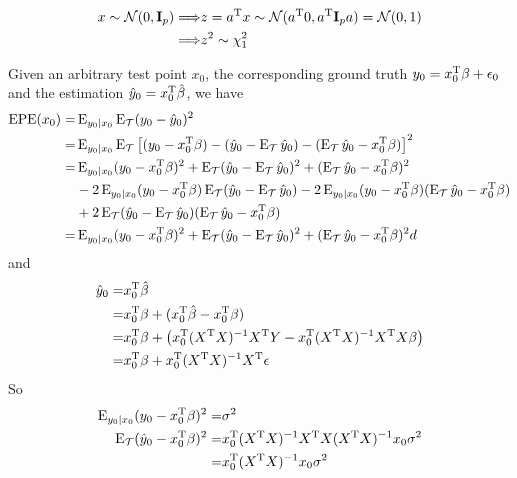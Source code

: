 \begin{sol}
\begin{align*}
x\sim\mathcal{N}(0,\mathbf{I}_p)\Longrightarrow & z=a^{\mathrm{T}}x\sim\mathcal{N}(a^{\mathrm{T}}0,a^{\mathrm{T}}\mathbf{I}_pa)=\mathcal{N}(0,1)\\
\Longrightarrow & z^2\sim \chi_1^2
\end{align*}
\end{sol}

\begin{sol}
Given an arbitrary test point $x_0$, the corresponding ground truth $y_0=x_0^{\mathrm{T}}\beta+\epsilon_0$ and the estimation $\hat{y}_0=x_0^{\mathrm{T}}\hat{\beta}$, we have
\begin{align*}
\mathrm{EPE}(x_0) = & \operatorname{E}_{y_0\vert x_0}\operatorname{E}_{\mathcal{T}}(y_0-\hat{y}_0)^2\\
=& \operatorname{E}_{y_0\vert x_0}\operatorname{E}_{\mathcal{T}}\left[(y_0-x_0^{\mathrm{T}}\beta)-(\hat{y}_0-\operatorname{E}_\mathcal{T}\hat{y}_0)-(\operatorname{E}_\mathcal{T}\hat{y}_0-x_0^{\mathrm{T}}\beta)\right]^2 \\
=& \operatorname{E}_{y_0\vert x_0}(y_0-x_0^{\mathrm{T}}\beta)^2+\operatorname{E}_{\mathcal{T}}(\hat{y}_0-\operatorname{E}_\mathcal{T}\hat{y}_0)^2+(\operatorname{E}_\mathcal{T}\hat{y}_0-x_0^{\mathrm{T}}\beta)^2 \\
& -2 \operatorname{E}_{y_0\vert x_0}(y_0-x_0^{\mathrm{T}}\beta) \operatorname{E}_{\mathcal{T}}(\hat{y}_0-\operatorname{E}_\mathcal{T}\hat{y}_0) -2 \operatorname{E}_{y_0\vert x_0}(y_0-x_0^{\mathrm{T}}\beta) (\operatorname{E}_\mathcal{T}\hat{y}_0-x_0^{\mathrm{T}}\beta) \\
& +2 \operatorname{E}_{\mathcal{T}}(\hat{y}_0-\operatorname{E}_\mathcal{T}\hat{y}_0)(\operatorname{E}_\mathcal{T}\hat{y}_0-x_0^{\mathrm{T}}\beta) \\
=& \operatorname{E}_{y_0\vert x_0}(y_0-x_0^{\mathrm{T}}\beta)^2+\operatorname{E}_{\mathcal{T}}(\hat{y}_0-\operatorname{E}_\mathcal{T}\hat{y}_0)^2+(\operatorname{E}_\mathcal{T}\hat{y}_0-x_0^{\mathrm{T}}\beta)^2d
\end{align*}
and
\begin{align*}
\hat{y}_0 =& x_0^{\mathrm{T}}\hat{\beta}\\
=& x_0^{\mathrm{T}}\beta + (x_0^{\mathrm{T}}\hat{\beta}-x_0^{\mathrm{T}}\beta)\\
=& x_0^{\mathrm{T}}\beta + \left(x_0^{\mathrm{T}}(X^{\mathrm{T}}X)^{-1}X^{\mathrm{T}}Y-x_0^{\mathrm{T}}(X^{\mathrm{T}}X)^{-1}X^{\mathrm{T}}X\beta\right) \\
=& x_0^{\mathrm{T}}\beta + x_0^{\mathrm{T}}(X^{\mathrm{T}}X)^{-1}X^{\mathrm{T}}\epsilon
\end{align*}
So
\begin{align*}
\E_{y_0\vert x_0}(y_0-\Tr{x_0}\beta)^2 =& \sigma^2 \\
\E_\mathcal{T} (\hat{y}_0-\Tr{x_0}\beta)^2 =& \Tr{x_0}(\Tr{X}X)^{-1}\Tr{X}X(\Tr{X}X)^{-1}x_0\sigma^2 \\
=& \Tr{x_0}(\Tr{X}X)^{-1}x_0\sigma^2 \\

\end{align*}
\end{sol}

